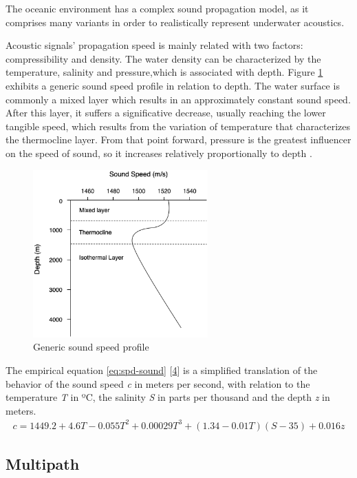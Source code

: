 The oceanic environment has a complex sound propagation model, as it comprises many variants in order to realistically represent underwater acoustics.

Acoustic signals' propagation speed is mainly related with two factors: compressibility and density. The water density can be characterized by the temperature, salinity and pressure,which is associated with depth. Figure \ref{fig:spd-sound} exhibits a generic sound speed profile in relation to depth. The water surface is commonly a mixed layer which results in an approximately constant sound speed. After this layer, it suffers a significative decrease, usually reaching the lower tangible speed, which results from the variation of temperature that characterizes the thermocline layer. From that point forward, pressure is the greatest influencer on the speed of sound, so it increases relatively proportionally to depth .

\begin{figure}[!htbp]
	\centering
	\includegraphics[width=0.6\textwidth]{figures/sound-profile}
	\caption{Generic sound speed profile}
	\label{fig:spd-sound}
\end{figure}

The empirical equation \ref{eq:spd-sound} [\hyperref[r:ocean-acoust]{4}] is a simplified translation of the behavior of the sound speed \textit{c} in meters per second, with relation to the temperature \textit{T} in ºC, the salinity \textit{S} in parts per thousand and the depth \textit{z} in meters. 
\begin{eqnarray}
c = 1449.2 + 4.6T - 0.055T^2 + 0.00029T^3 + (1.34 - 0.01T)(S-35) + 0.016z 
\label{eq:spd-sound}
\end{eqnarray}


\subsection{Multipath} \label{subsec:multipath}

